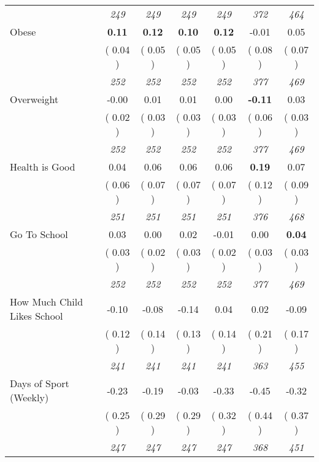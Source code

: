 \begin{tabular}{l c c c c c c}
& \textit{ 249 } & \textit{ 249 } & \textit{ 249 } & \textit{ 249 } & \textit{ 372 } & \textit{ 464 } \\
Obese & \textbf{      0.11 } & \textbf{      0.12 } & \textbf{      0.10 } & \textbf{     0.12} &     -0.01 &      0.05 \\
& (     0.04 ) & (     0.05 ) & (     0.05 ) & (     0.05 ) & (     0.08 ) & (     0.07 ) \\
& \textit{ 252 } & \textit{ 252 } & \textit{ 252 } & \textit{ 252 } & \textit{ 377 } & \textit{ 469 } \\
Overweight &     -0.00 &      0.01 &      0.01 &      0.00 & \textbf{     -0.11 } &      0.03 \\
& (     0.02 ) & (     0.03 ) & (     0.03 ) & (     0.03 ) & (     0.06 ) & (     0.03 ) \\
& \textit{ 252 } & \textit{ 252 } & \textit{ 252 } & \textit{ 252 } & \textit{ 377 } & \textit{ 469 } \\
Health is Good &      0.04 &      0.06 &      0.06 &      0.06 & \textbf{      0.19 } &      0.07 \\
& (     0.06 ) & (     0.07 ) & (     0.07 ) & (     0.07 ) & (     0.12 ) & (     0.09 ) \\
& \textit{ 251 } & \textit{ 251 } & \textit{ 251 } & \textit{ 251 } & \textit{ 376 } & \textit{ 468 } \\
Go To School &      0.03 &      0.00 &      0.02 &     -0.01 &      0.00 & \textbf{      0.04 } \\
& (     0.03 ) & (     0.02 ) & (     0.03 ) & (     0.02 ) & (     0.03 ) & (     0.03 ) \\
& \textit{ 252 } & \textit{ 252 } & \textit{ 252 } & \textit{ 252 } & \textit{ 377 } & \textit{ 469 } \\
How Much Child Likes School &     -0.10 &     -0.08 &     -0.14 &      0.04 &      0.02 &     -0.09 \\
& (     0.12 ) & (     0.14 ) & (     0.13 ) & (     0.14 ) & (     0.21 ) & (     0.17 ) \\
& \textit{ 241 } & \textit{ 241 } & \textit{ 241 } & \textit{ 241 } & \textit{ 363 } & \textit{ 455 } \\
Days of Sport (Weekly) &     -0.23 &     -0.19 &     -0.03 &     -0.33 &     -0.45 &     -0.32 \\
& (     0.25 ) & (     0.29 ) & (     0.29 ) & (     0.32 ) & (     0.44 ) & (     0.37 ) \\
& \textit{ 247 } & \textit{ 247 } & \textit{ 247 } & \textit{ 247 } & \textit{ 368 } & \textit{ 451 } \\
\bottomrule
\end{tabular}
